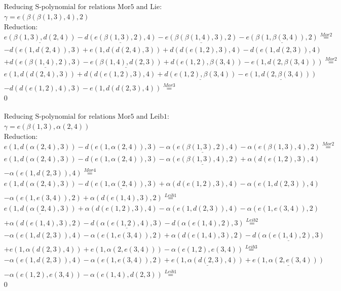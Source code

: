 \documentclass[11pt]{amsart}
\begin{document}
\begin{align*} 
& \text{Reducing S-polynomial for relations Mor5 and Lie:} \\ 
& \gamma = e(\beta(\beta(1,3),4),2) \\ 
& \text{Reduction}: \\&\underline{e(\beta(1,3),d(2,4))} - \underline{d(e(\beta(1,3),2),4)} - \underline{e(\beta(\beta(1,4),3),2)} - \underline{e(\beta(1,\beta(3,4)),2)} \stackrel{ Mor2 }{=}  \\ 
& - d(e(1,d(2,4)),3) + e(1,d(d(2,4),3)) + d(d(e(1,2),3),4) - d(e(1,d(2,3)),4)\\ 
 &  + \underline{d(e(\beta(1,4),2),3)} - \underline{e(\beta(1,4),d(2,3))} + d(e(1,2),\beta(3,4)) - e(1,d(2,\beta(3,4))) \stackrel{ Mor2 }{=}  \\ 
&e(1,d(d(2,4),3)) + d(d(e(1,2),3),4) + \underline{d(e(1,2),\beta(3,4))} - \underline{e(1,d(2,\beta(3,4)))}\\ 
 &  - d(d(e(1,2),4),3) - e(1,d(d(2,3),4)) \stackrel{ Mor3 }{=}  \\ 
&0\\ 
\end{align*} 
 
\begin{align*} 
& \text{Reducing S-polynomial for relations Mor5 and Leib1:} \\ 
& \gamma = e(\beta(1,3),\alpha(2,4)) \\ 
& \text{Reduction}: \\&e(1,d(\alpha(2,4),3)) - d(e(1,\alpha(2,4)),3) - \underline{\alpha(e(\beta(1,3),2),4)} - \alpha(e(\beta(1,3),4),2) \stackrel{ Mor2 }{=}  \\ 
&e(1,d(\alpha(2,4),3)) - d(e(1,\alpha(2,4)),3) - \underline{\alpha(e(\beta(1,3),4),2)} + \alpha(d(e(1,2),3),4)\\ 
 &  - \alpha(e(1,d(2,3)),4) \stackrel{ Mor4 }{=}  \\ 
&e(1,d(\alpha(2,4),3)) - \underline{d(e(1,\alpha(2,4)),3)} + \alpha(d(e(1,2),3),4) - \alpha(e(1,d(2,3)),4)\\ 
 &  - \alpha(e(1,e(3,4)),2) + \alpha(d(e(1,4),3),2) \stackrel{ Leib1 }{=}  \\ 
&\underline{e(1,d(\alpha(2,4),3))} + \alpha(d(e(1,2),3),4) - \alpha(e(1,d(2,3)),4) - \alpha(e(1,e(3,4)),2)\\ 
 &  + \alpha(d(e(1,4),3),2) - \underline{d(\alpha(e(1,2),4),3)} - d(\alpha(e(1,4),2),3) \stackrel{ Leib2 }{=}  \\ 
& - \alpha(e(1,d(2,3)),4) - \alpha(e(1,e(3,4)),2) + \alpha(d(e(1,4),3),2) - \underline{d(\alpha(e(1,4),2),3)}\\ 
 &  + e(1,\alpha(d(2,3),4)) + e(1,\alpha(2,e(3,4))) - \alpha(e(1,2),e(3,4)) \stackrel{ Leib3 }{=}  \\ 
& - \alpha(e(1,d(2,3)),4) - \alpha(e(1,e(3,4)),2) + \underline{e(1,\alpha(d(2,3),4))} + \underline{e(1,\alpha(2,e(3,4)))}\\ 
 &  - \alpha(e(1,2),e(3,4)) - \alpha(e(1,4),d(2,3)) \stackrel{ Leib1 }{=}  \\ 
&0\\ 
\end{align*} 
 
\end{document}
